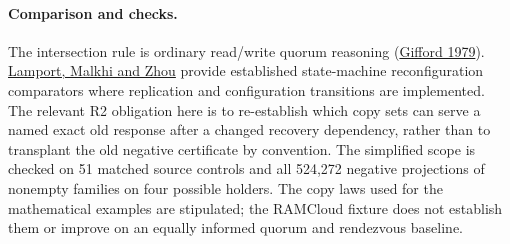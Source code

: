 \documentclass{article}
\begin{document}
\paragraph{Comparison and checks.}
The intersection rule is ordinary read/write quorum reasoning
(\href{https://doi.org/10.1145/800215.806583}{Gifford 1979}).
\href{https://lamport.org/pubs/reconfiguration-tutorial.pdf}{Lamport,
Malkhi and Zhou} provide established state-machine reconfiguration
comparators where replication and configuration transitions are
implemented. The relevant R2 obligation here is to re-establish
which copy sets can serve a named exact old response after a
changed recovery dependency, rather than to transplant the
old negative certificate by convention. The simplified scope is
checked on 51 matched source controls and all 524,272 negative
projections of nonempty families on four possible holders.
The copy laws used for the mathematical examples are stipulated;
the RAMCloud fixture does not establish them or improve on an
equally informed quorum and rendezvous baseline.
\end{document}
